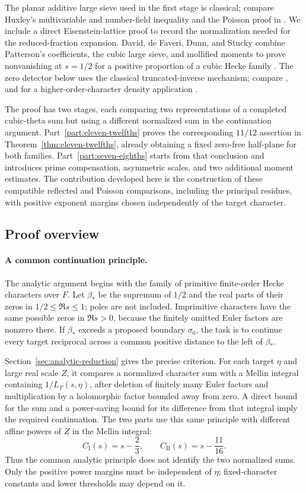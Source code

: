 The planar additive large sieve used in the first stage is classical;
compare Huxley's multivariable and number-field inequality \cite{Huxley}
and the Poisson proof in \cite[Section 3, Theorem 3]{BaierBansal}.
We include a direct Eisenstein-lattice proof to record the normalization
needed for the reduced-fraction expansion. David, de Faveri, Dunn, and
Stucky combine Patterson's coefficients, the cubic large sieve, and
mollified moments to prove nonvanishing at $s=1/2$ for a positive
proportion of a cubic Hecke family
\cite[Theorem 1.1 and Section 1.2]{DFDS}. The zero detector below uses
the classical truncated-inverse mechanism; compare
\cite[Appendix C]{MP}, and for a higher-order-character
density application \cite[Corollary 1.6 and Section 5]{BGL}.

The proof has two stages, each comparing two representations of a
completed cubic-theta sum but using a different normalized sum in the
continuation argument. Part~\ref{part:eleven-twelfths} proves the corresponding
$11/12$ assertion in Theorem~\ref{thm:eleven-twelfths}, already obtaining a
fixed zero-free half-plane for both families.
Part~\ref{part:seven-eighths} starts from that conclusion and introduces
prime compensation, asymmetric scales, and two additional moment estimates.
The contribution developed here is the construction of these compatible
reflected and Poisson comparisons, including the principal residues, with
positive exponent margins chosen independently of the target character.

\subsection*{Proof overview}

\paragraph{A common continuation principle.}
The analytic argument begins with the family of primitive finite-order
Hecke characters over $F$. Let $\beta_*$ be the supremum of $1/2$ and the
real parts of their zeros in $1/2\le\Re s\le1$; poles are not included.
Imprimitive characters have the same possible zeros in $\Re s>0$, because
the finitely omitted Euler factors are nonzero there. If $\beta_*$ exceeds
a proposed boundary $\sigma_0$, the task is to continue every target
reciprocal across a common positive distance to the left of $\beta_*$.

Section~\ref{sec:analytic-reduction} gives the precise criterion. For each
target $\eta$ and large real scale $Z$, it compares a normalized character
sum with a Mellin integral containing $1/L_F(s,\eta)$, after deletion of
finitely many Euler factors and multiplication by a holomorphic factor
bounded away from zero. A direct bound for the sum and a power-saving bound
for its difference from that integral imply the required continuation.
The two parts use this same principle with different affine powers of $Z$
in the Mellin integral:
\[
 C_{\mathrm I}(s)=s-\frac23,\qquad
 C_{\mathrm{II}}(s)=s-\frac{11}{16}.
\]
Thus the common analytic principle does not identify the two normalized
sums. Only the positive power margins must be independent of $\eta$;
fixed-character constants and lower thresholds may depend on it.

